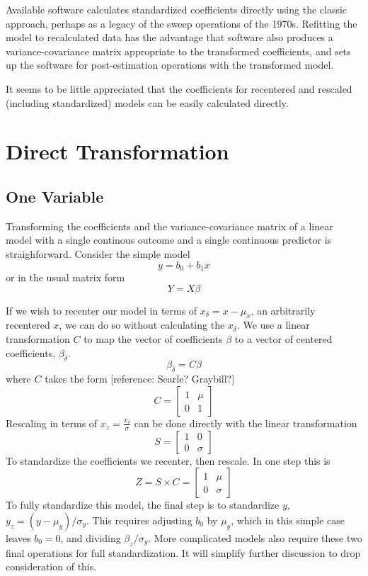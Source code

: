 \documentclass[]{article}
\begin{document}
Available software calculates standardized coefficients directly using
the classic approach, perhaps as a legacy of the sweep operations of the
1970s. Refitting the model to recalculated data has the advantage that
software also produces a variance-covariance matrix appropriate to the
transformed coefficients, and sets up the software for post-estimation
operations with the transformed model.

It seems to be little appreciated that the coefficients for recentered
and rescaled (including standardized) models can be easily calculated
directly.

\hypertarget{direct-transformation}{%
\section{Direct Transformation}\label{direct-transformation}}

\hypertarget{one-variable}{%
\subsection{One Variable}\label{one-variable}}

Transforming the coefficients and the variance-covariance matrix of a
linear model with a single continous outcome and a single continuous
predictor is straighforward. Consider the simple model
\[y = b_0 + b_1x\] or in the usual matrix form \[Y=X\beta\]

If we wish to recenter our model in terms of \(x_\delta=x-\mu_x\), an
arbitrarily recentered \(x\), we can do so without calculating the
\(x_\delta\). We use a linear transformation \(C\) to map the vector of
coefficients \(\beta\) to a vector of centered coefficients,
\(\beta_\delta\). \[\beta_\delta=C\beta\] where \(C\) takes the form
{[}reference: Searle? Graybill?{]}
\[C=\begin{bmatrix}1 & \mu \\ 0 & 1 \end{bmatrix}\] Rescaling in terms
of \(x_z=\frac{x_\delta}{\sigma}\) can be done directly with the linear
transformation \[S=\begin{bmatrix}1 & 0 \\ 0 & \sigma \end{bmatrix}\] To
standardize the coefficients we recenter, then rescale. In one step this
is
\[Z = S \times C =\begin{bmatrix}1 & \mu \\ 0 & \sigma \end{bmatrix}\]
To fully standardize this model, the final step is to standardize \(y\),
\(y_z=(y-\mu_y)/\sigma_y\). This requires adjusting \(b_0\) by
\(\mu_y\), which in this simple case leaves \(b_0=0\), and dividing
\(\beta_z/\sigma_y\). More complicated models also require these two
final operations for full standardization. It will simplify further
discussion to drop consideration of this.
\end{document}
